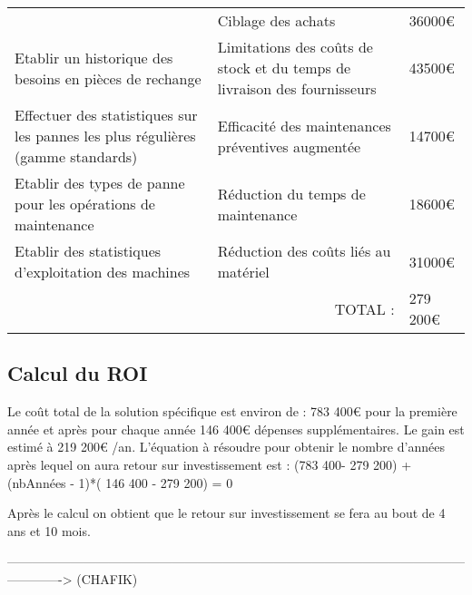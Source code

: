 \begin{description}
\begin{tabular}{|p{7cm}|p{5cm}|p{2cm}|}
                                  & Ciblage des achats
                                                          &  36000€ \\ \cline{1-2} 
Etablir un historique des besoins en pièces de rechange
                                  & Limitations des coûts de stock et du temps de livraison des fournisseurs
                                                          &  43500€ \\ \cline{1-2} 
Effectuer des statistiques sur les pannes les plus régulières (gamme standards)
                                  & Efficacité des maintenances préventives augmentée
                                                          &   14700€\\ \cline{1-2}         
Etablir des types de panne pour les opérations de maintenance
                                  & Réduction du temps de maintenance
                                                          &   18600€\\ \cline{1-2}

Etablir des statistiques d'exploitation des machines
                                  & Réduction des coûts liés au matériel
                                                          &  31000€ \\ \hline  
\multicolumn{2}{|r|}{TOTAL :} & 279 200€ \\ \hline                                                                                                                                                                                                                      
      
\end{tabular}
        
\subsection{Calcul du ROI}

Le coût total de la solution spécifique est environ de : 783 400€ pour la première année et après pour chaque année 146 400€ dépenses supplémentaires. Le gain est estimé à 219 200€ /an. L'équation à résoudre pour obtenir le nombre
d'années après lequel on aura retour sur investissement est : (783 400- 279 200) + (nbAnnées - 1)*( 146 400 - 279 200) = 0

Après le calcul on obtient que le retour sur investissement se fera au bout de 4 ans et 10 mois.


-------------------------------------------------------------------------------------------------------------------------> (CHAFIK)

\end{description}
